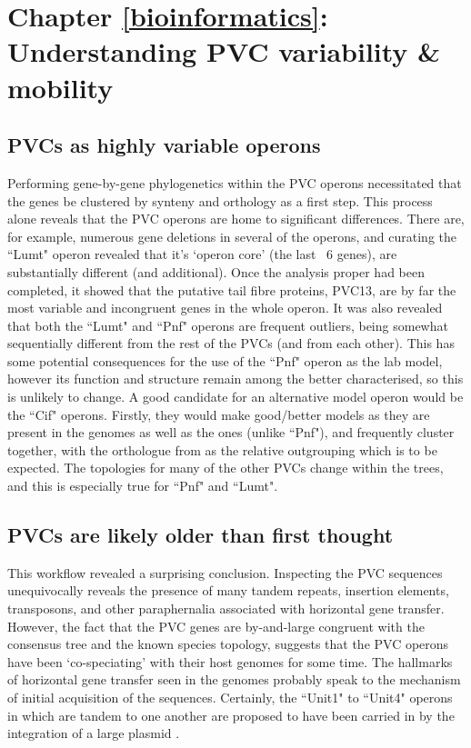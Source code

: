 \section{Chapter \ref{bioinformatics}: Understanding PVC variability \& mobility} 
\subsection{PVCs as highly variable operons}
Performing gene-by-gene phylogenetics within the PVC operons necessitated that the genes be clustered by synteny and orthology as a first step. This process alone reveals that the PVC operons are home to significant differences. There are, for example, numerous gene deletions in several of the operons, and curating the ``Lumt" operon revealed that it's `operon core' (the last ~6 genes), are substantially different (and additional). Once the analysis proper had been completed, it showed that the putative tail fibre proteins, PVC13, are by far the most variable and incongruent genes in the whole operon. It was also revealed that both the ``Lumt" and ``Pnf" operons are frequent outliers, being somewhat sequentially different from the rest of the PVCs (and from each other). This has some potential consequences for the use of the ``Pnf" operon as the lab model, however its function and structure remain among the better characterised, so this is unlikely to change. A good candidate for an alternative model operon would be the ``Cif" operons. Firstly, they would make good/better models as they are present in the \Plum{} genomes as well as the \Pasy{} ones (unlike ``Pnf"), and frequently cluster together, with the orthologue from \Plum{} as the relative outgrouping which is to be expected. The topologies for many of the other PVCs change within the trees, and this is especially true for ``Pnf" and ``Lumt".

\subsection{PVCs are likely older than first thought}
This workflow revealed a surprising conclusion. Inspecting the PVC sequences unequivocally reveals the presence of many tandem repeats, insertion elements, transposons, and other paraphernalia associated with horizontal gene transfer. However, the fact that the PVC genes are by-and-large congruent with the consensus tree and the known species topology, suggests that the PVC operons have been `co-speciating' with their host genomes for some time. The hallmarks of horizontal gene transfer seen in the genomes probably speak to the mechanism of initial acquisition of the sequences. Certainly, the ``Unit1" to ``Unit4" operons in \Plum{} which are tandem to one another are proposed to have been carried in by the integration of a large plasmid \citep{Yang2006}.

